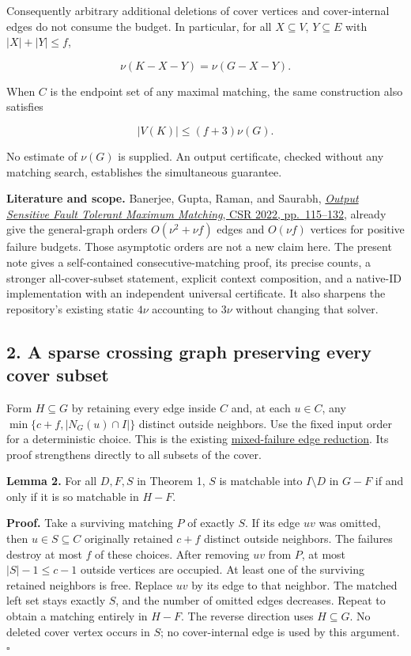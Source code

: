 Consequently arbitrary additional deletions of cover vertices and cover-internal edges do not consume the budget. In particular, for all \(X\subseteq V\), \(Y\subseteq E\) with \(|X|+|Y|\leq f\),

\[
\nu(K-X-Y)=\nu(G-X-Y).
\]

When \(C\) is the endpoint set of any maximal matching, the same construction also satisfies

\[
|V(K)|\leq (f+3)\nu(G).
\]

No estimate of \(\nu(G)\) is supplied. An output certificate, checked without any matching search, establishes the simultaneous guarantee.

\textbf{Literature and scope.} Banerjee, Gupta, Raman, and Saurabh, \href{https://doi.org/10.1007/978-3-031-09574-0_8}{\emph{Output Sensitive Fault Tolerant Maximum Matching}, CSR 2022, pp.~115--132}, already give the general-graph orders \(O(\nu^2+\nu f)\) edges and \(O(\nu f)\) vertices for positive failure budgets. Those asymptotic orders are not a new claim here. The present note gives a self-contained consecutive-matching proof, its precise counts, a stronger all-cover-subset statement, explicit context composition, and a native-ID implementation with an independent universal certificate. It also sharpens the repository's existing static \(4\nu\) accounting to \(3\nu\) without changing that solver.

\hypertarget{af-321c79486f-a-sparse-crossing-graph-preserving-every-cover-subset}{%
\subsection{2. A sparse crossing graph preserving every cover subset}\label{af-321c79486f-a-sparse-crossing-graph-preserving-every-cover-subset}}

Form \(H\subseteq G\) by retaining every edge inside \(C\) and, at each \(u\in C\), any \(\min\{c+f,|N_G(u)\cap I|\}\) distinct outside neighbors. Use the fixed input order for a deterministic choice. This is the existing \href{https://github.com/icekylinx/algorithm-frontier/blob/main/manuscripts/graph-backends/matching-size-kernel-corollary.md\#4-one-kernel-for-mixed-vertex-and-edge-failures}{mixed-failure edge reduction}. Its proof strengthens directly to all subsets of the cover.

\textbf{Lemma 2.} For all \(D,F,S\) in Theorem 1, \(S\) is matchable into \(I\setminus D\) in \(G-F\) if and only if it is so matchable in \(H-F\).

\textbf{Proof.} Take a surviving matching \(P\) of exactly \(S\). If its edge \(uv\) was omitted, then \(u\in S\subseteq C\) originally retained \(c+f\) distinct outside neighbors. The failures destroy at most \(f\) of these choices. After removing \(uv\) from \(P\), at most \(|S|-1\leq c-1\) outside vertices are occupied. At least one of the surviving retained neighbors is free. Replace \(uv\) by its edge to that neighbor. The matched left set stays exactly \(S\), and the number of omitted edges decreases. Repeat to obtain a matching entirely in \(H-F\). The reverse direction uses \(H\subseteq G\). No deleted cover vertex occurs in \(S\); no cover-internal edge is used by this argument. \hfill\(\square\)

